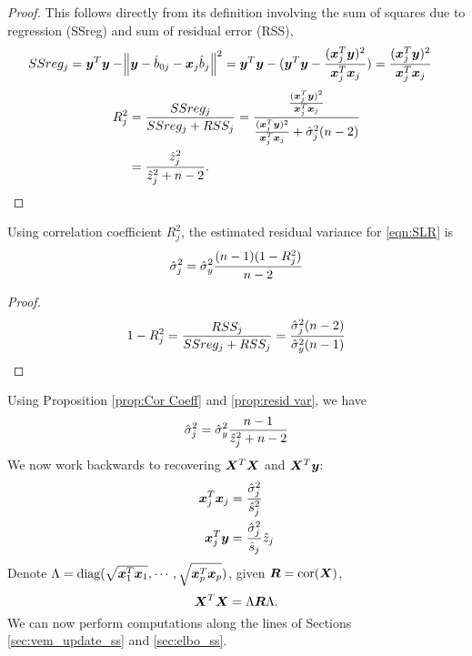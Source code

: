 \begin{proof}
This follows directly from its definition involving the sum of squares due to regression (SSreg) and sum of residual error (RSS),
\begin{align}
    SSreg_j &= \bm y^T \bm y - \norm{\bm y - \hat{b}_{0j} - \bm x_{j} \hat{b}_{j}}^2 = \bm y^T \bm y - (\bm y^T \bm y - \frac{(\bm x_{j}^{T}\bm y)^2}{\bm x_{j}^{T}\bm x_{j}}) = \frac{(\bm x_{j}^{T}\bm y)^2}{\bm x_{j}^{T}\bm x_{j}}
\end{align}
\begin{align}
    R_{j}^2 &= \frac{SSreg_j}{SSreg_j + RSS_j} = \frac{\frac{(\bm x_{j}^{T}\bm y)^2}{\bm x_{j}^{T}\bm x_{j}}}{\frac{(\bm x_{j}^{T}\bm y)^2}{\bm x_{j}^{T}\bm x_{j}} + \hat{\sigma}_{j}^{2}(n-2)} \\
    &= \frac{\hat{z}_{j}^2}{\hat{z}_{j}^2+n-2}.
\end{align}
\end{proof}

\begin{proposition} \label{prop:resid var}
Using correlation coefficient $R^2_j$, the estimated residual variance for \eqref{eqn:SLR} is
\begin{equation}
    \hat{\sigma}_{j}^2 = \hat{\sigma}_y^2\frac{(n-1)(1-R_{j}^2)}{n-2} \label{eqn:sigma2hat}
\end{equation}
\end{proposition}
\begin{proof}
\begin{equation}
    1-R_{j}^{2} = \frac{RSS_j}{SSreg_j + RSS_j} = \frac{\hat{\sigma}_{j}^2(n-2)}{\hat{\sigma}_y^2(n-1)}
\end{equation}
\end{proof}
Using Proposition \ref{prop:Cor Coeff} and \ref{prop:resid var}, we have 
\begin{equation}\label{eqn:residj}
    \hat{\sigma}_{j}^2 = \hat{\sigma}_y^2 \frac{n-1}{\hat{z}_{j}^2+n-2}
\end{equation}
We now work backwards to recovering $\bm X^T\bm X$ and $\bm X^T\bm y$:
\begin{align}
    \bm x_j^{T}\bm x_j &= \frac{\hat{\sigma}_{j}^2}{\hat{s}_{j}^{2}} \label{eqn:xtxjj} \\
    \bm x_j^{T}\bm y &= \frac{\hat{\sigma}_{j}^2}{\hat{s}_{j}} \hat{z}_{j} \label{eqn:xty}
\end{align}
Denote $\Lambda = \text{diag}(\sqrt{\bm x_1^{T}\bm x_1}, \cdots, \sqrt{\bm x_p^{T}\bm x_p})$, given $\bm R = \text{cor}(\bm X)$,
\begin{equation}\label{eqn:xtx}
    \bm X^T \bm X = \Lambda \bm R \Lambda.
\end{equation}
We can now perform \susie computations along the lines of Sections \ref{sec:vem_update_ss} and \ref{sec:elbo_ss}.

